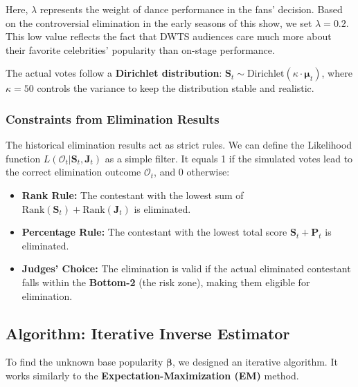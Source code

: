 Here, $\lambda$ represents the weight of dance performance in the fans' decision.
Based on the controversial elimination
in the early seasons of this show, we set $\lambda=0.2$.
This low value reflects the fact that DWTS audiences care much more about
their favorite celebrities' popularity than on-stage performance.

The actual votes follow a \textbf{Dirichlet distribution}:
$\mathbf{S}_t \sim \text{Dirichlet}(\kappa \cdot \boldsymbol{\mu}_t)$,
where $\kappa=50$ controls the variance to keep the distribution stable and realistic.

\subsubsection{Constraints from Elimination Results}
The historical elimination results act as strict rules.
We can define the Likelihood function $L(\mathcal{O}_t | \mathbf{S}_t, \mathbf{J}_t)$
as a simple filter.
It equals 1 if the simulated votes lead to the correct elimination outcome $\mathcal{O}_t$, and 0 otherwise:
\begin{itemize}
    \item \textbf{Rank Rule:} The contestant with the lowest sum of $\text{Rank}(\mathbf{S}_t) + \text{Rank}(\mathbf{J}_t)$ is eliminated.
    \item \textbf{Percentage Rule:} The contestant with the lowest total score $\mathbf{S}_t + \mathbf{P}_t$ is eliminated.
    \item \textbf{Judges' Choice:} The elimination is valid if the actual eliminated contestant falls within the \textbf{Bottom-2} (the risk zone), making them eligible for elimination.
\end{itemize}

\subsection{Algorithm: Iterative Inverse Estimator}

To find the unknown base popularity $\boldsymbol{\beta}$, we designed an iterative algorithm. It works similarly to the \textbf{Expectation-Maximization (EM)} method.

